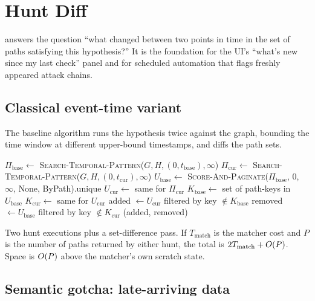 \chapter{Hunt Diff}
\label{ch:hunt-diff}

 answers the question ``what changed between two
points in time in the set of paths satisfying this hypothesis?''
It is the foundation for the UI's ``what's new since my last
check'' panel and for scheduled automation that flags freshly
appeared attack chains.

\section{Classical event-time variant}

The baseline algorithm runs the hypothesis twice against the
graph, bounding the time window at different upper-bound
timestamps, and diffs the path sets.

\begin{algorithm}
\caption{\textsc{Diff-Hunts}}\label{alg:diff-hunts}
$\Pi_{\text{base}} \gets $ \textsc{Search-Temporal-Pattern}($G, H, (0, t_{\text{base}}), \infty$)\;
$\Pi_{\text{cur}} \gets $ \textsc{Search-Temporal-Pattern}($G, H, (0, t_{\text{cur}}), \infty$)\;
$U_{\text{base}} \gets $ \textsc{Score-And-Paginate}($\Pi_{\text{base}}$, 0, $\infty$, None, ByPath).unique\;
$U_{\text{cur}} \gets $ same for $\Pi_{\text{cur}}$\;
$K_{\text{base}} \gets $ set of path-keys in $U_{\text{base}}$\;
$K_{\text{cur}} \gets $ same for $U_{\text{cur}}$\;
added $\gets U_{\text{cur}}$ filtered by key $\notin K_{\text{base}}$\;
removed $\gets U_{\text{base}}$ filtered by key $\notin K_{\text{cur}}$\;
\Return (added, removed)\;
\end{algorithm}

\begin{complexity}
Two hunt executions plus a set-difference pass. If
$T_{\text{match}}$ is the matcher cost and $P$ is the number of
paths returned by either hunt, the total is
$2 T_{\text{match}} + O(P)$. Space is $O(P)$ above the matcher's
own scratch state.
\end{complexity}

\section{Semantic gotcha: late-arriving data}

